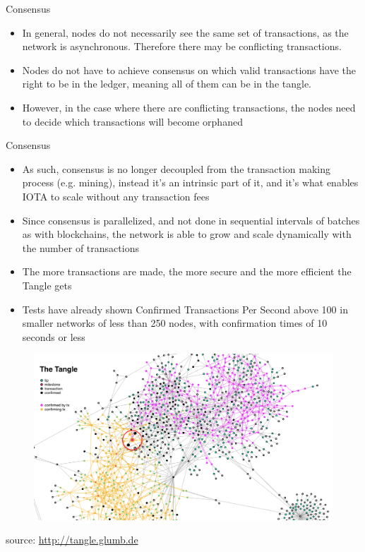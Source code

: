 \documentclass[11pt]{beamer}
\begin{document}
\begin{frame}{Consensus}
	\begin{itemize}
		\item In general, nodes do not necessarily see the same set of transactions, as the network is asynchronous. Therefore there may be conflicting transactions.
		\item Nodes do not have to achieve consensus on which valid transactions have the right to be in the ledger, meaning all of them can be in the tangle.
		\item However, in the case where there are conflicting transactions, the nodes need to decide which transactions will become orphaned
	\end{itemize}
\end{frame}


\begin{frame}{Consensus}
	\begin{itemize}
		\item As such, consensus is no longer decoupled from the transaction making process (e.g. mining), instead it's an intrinsic part of it, and it's what enables IOTA to scale without any transaction fees
		\item Since consensus is parallelized, and not done in sequential intervals of batches as with blockchains, the network is able to grow and scale dynamically with the number of transactions
		\item The more transactions are made, the more secure and the more efficient the Tangle gets
		\item Tests have already shown Confirmed Transactions Per Second above 100 in smaller networks of less than 250 nodes, with confirmation times of 10 seconds or less
	\end{itemize}
\end{frame}


\begin{frame}{}
	\begin{figure}[]
		\centering
		\includegraphics  [scale=0.3]{Images/tangle}
	\end{figure}
	\begin{scriptsize}
		source: \href{http://tangle.glumb.de}{http://tangle.glumb.de}
	\end{scriptsize}
\end{frame}
\end{document}
